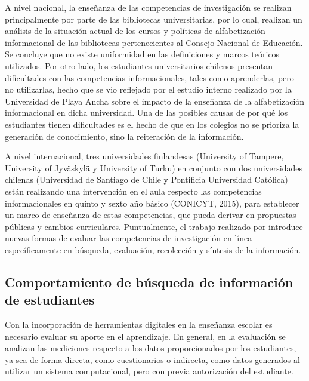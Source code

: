 A nivel nacional, la enseñanza de las competencias de investigación se realizan principalmente por parte de las bibliotecas universitarias, por lo cual, \textcite{marzal2015diagnostico} realizan un análisis de la situación actual de los cursos y políticas de alfabetización informacional de las bibliotecas pertenecientes al Consejo Nacional de Educación. Se concluye que no existe uniformidad en las definiciones y marcos teóricos utilizados. Por otro lado, los estudiantes universitarios chilenos presentan dificultades con las competencias informacionales, tales como aprenderlas, pero no utilizarlas, hecho que se vio reflejado por el estudio interno realizado por la Universidad de Playa Ancha \parencite{urra2016alfabetizacion} sobre el impacto de la enseñanza de la alfabetización informacional en dicha universidad. Una de las posibles causas de por qué los estudiantes tienen dificultades es el hecho de que en los colegios no se prioriza la generación de conocimiento, sino la reiteración de la información.

A nivel internacional, tres universidades finlandesas (University of Tampere, University of Jyv\"askyl\"a y University of Turku) en conjunto con dos universidades chilenas (Universidad de Santiago de Chile y Pontificia Universidad Católica) están realizando una intervención en el aula respecto las competencias informacionales en quinto y sexto año básico (CONICYT, 2015), para establecer un marco de enseñanza de estas competencias, que pueda derivar en propuestas públicas y cambios curriculares. Puntualmente, el trabajo realizado por \textcite{gonzalez2017neurone} introduce nuevas formas de evaluar las competencias de investigación en línea específicamente en búsqueda, evaluación, recolección y síntesis de la información.

\subsection{Comportamiento de búsqueda de información de estudiantes}


Con la incorporación de herramientas digitales en la enseñanza escolar es necesario evaluar su aporte en el aprendizaje. En general, en la evaluación se analizan las mediciones respecto a los datos proporcionados por los estudiantes, ya sea de forma directa, como cuestionarios o indirecta, como datos generados al utilizar un sistema computacional, pero con previa autorización del estudiante.

